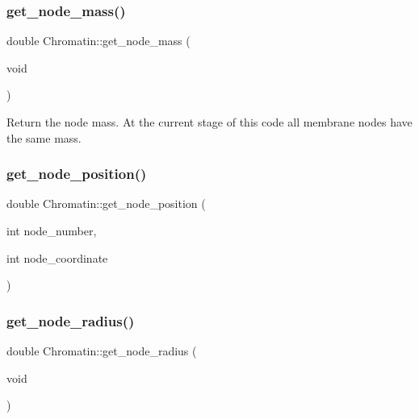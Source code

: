 \subsubsection{\texorpdfstring{get\_node\_mass()}{get\_node\_mass()}}
{\footnotesize\ttfamily double Chromatin\+::get\+\_\+node\+\_\+mass (\begin{DoxyParamCaption}\item[{void}]{ }\end{DoxyParamCaption})\hspace{0.3cm}{\ttfamily [inline]}}

Return the node mass. At the current stage of this code all membrane nodes have the same mass. \mbox{\label{classChromatin_a8e0ab06240f3a90708766c537b41e324}} 
\subsubsection{\texorpdfstring{get\_node\_position()}{get\_node\_position()}}
{\footnotesize\ttfamily double Chromatin\+::get\+\_\+node\+\_\+position (\begin{DoxyParamCaption}\item[{int}]{node\+\_\+number,  }\item[{int}]{node\+\_\+coordinate }\end{DoxyParamCaption})\hspace{0.3cm}{\ttfamily [inline]}}

\mbox{\label{classChromatin_a9dc3e8b66126b30c38c770a475a60f6d}} 
\subsubsection{\texorpdfstring{get\_node\_radius()}{get\_node\_radius()}}
{\footnotesize\ttfamily double Chromatin\+::get\+\_\+node\+\_\+radius (\begin{DoxyParamCaption}\item[{void}]{ }\end{DoxyParamCaption})\hspace{0.3cm}{\ttfamily [inline]}}

\mbox{\label{classChromatin_a82bb23b48d3823a1b976716fac70ad70}} 
